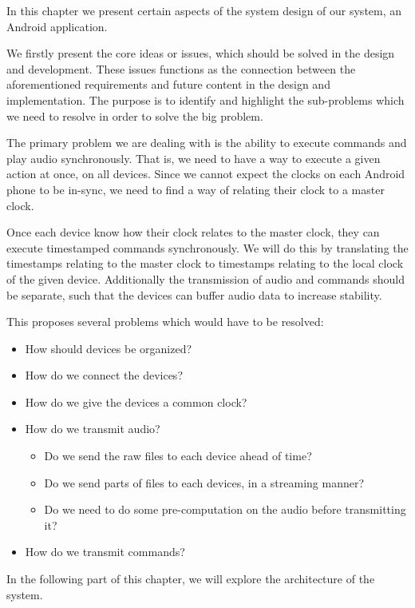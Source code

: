 In this chapter we present certain aspects of the system design of our system, an Android application.

We firstly present the core ideas or issues, which should be solved in the design and development.
These issues functions as the connection between the aforementioned requirements and future content in the design and implementation.
The purpose is to identify and highlight the sub-problems which we need to resolve in order to solve the big problem.

The primary problem we are dealing with is the ability to execute commands and play audio synchronously.
That is, we need to have a way to execute a given action at once, on all devices.
Since we cannot expect the clocks on each Android phone to be in-sync, we need to find a way of relating their clock to a master clock.

Once each device know how their clock relates to the master clock, they can execute timestamped commands synchronously.
We will do this by translating the timestamps relating to the master clock to timestamps relating to the local clock of the given device.
Additionally the transmission of audio and commands should be separate, such that the devices can buffer audio data to increase stability.

This proposes several problems which would have to be resolved:
\begin{itemize}
    \item How should devices be organized?
    \item How do we connect the devices?
    \item How do we give the devices a common clock?
    \item How do we transmit audio?
    \begin{itemize}
        \item Do we send the raw files to each device ahead of time?
        \item Do we send parts of files to each devices, in a streaming manner?
        \item Do we need to do some pre-computation on the audio before transmitting it?
    \end{itemize}
    \item How do we transmit commands?
\end{itemize}

\bigskip\noindent
In the following part of this chapter, we will explore the architecture of the system.

